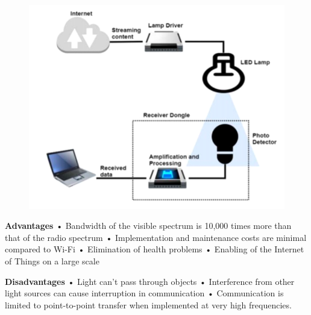 \documentclass[a0paper,portrait]{baposter}
\begin{document}
\begin{poster}
{\begin{figure}
	{\includegraphics[scale=0.15]{Lifi}}
\end{figure}                                             
 \textbf{Advantages} • Bandwidth of the visible spectrum is 10,000 times more than that of the radio spectrum • Implementation and maintenance costs are minimal compared to Wi-Fi • Elimination of health problems • Enabling of the Internet of Things on a large scale

\textbf{Disadvantages} • Light can’t pass through objects  • Interference from other light sources can cause interruption in communication •	 Communication is limited to point-to-point transfer when implemented at very high frequencies.


}

\end{poster}
\end{document}

